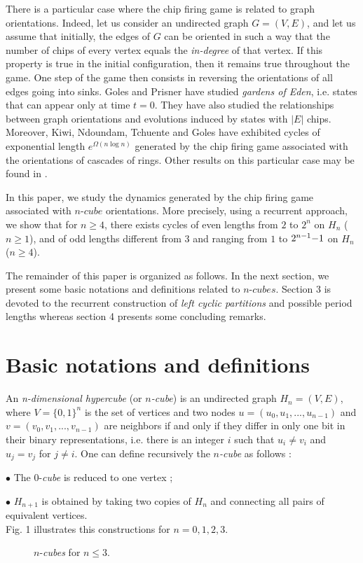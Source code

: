 \documentclass{article}
\begin{document}
There is a particular case where the chip firing game is related to graph
orientations. Indeed, let us consider an undirected graph $G=(V,E)$, and let
us
assume that initially, the edges of $G$ can be oriented in such a way that the
number of chips of every vertex equals the {\em in-degree} of that vertex. If
this property is true in the initial configuration, then it remains true throughout the
game. One step of the game then consists in reversing the orientations of all
edges going into sinks. Goles and Prisner \cite{GOL:00} have studied {\em gardens
of Eden}, i.e. states that can appear only at time $t=0$. They have also
studied the relationships between graph orientations and evolutions induced by
states with $|E|$ chips. Moreover, Kiwi, Ndoundam, Tchuente and Goles
\cite{KIW:94} have exhibited cycles of exponential length $e^{\Omega (n\log n)}$
generated by the chip firing game associated with the orientations of cascades
of rings. Other results on this particular case may be found in \cite{ERI:94}.

In this paper, we study the dynamics generated by the chip firing game
associated with $n$-$cube$ orientations. More precisely, using a
recurrent approach, we show that for $n\geq 4$, there exists cycles of even lengths from
 $2$ to $2^n$ on $H_n$ ($n\geq 1$), and of odd lengths different from $3$ and ranging from $1$ to
 $2^{n{\rm -}1}{\rm -}1$ on $H_n$ ($n\geq 4$).

The remainder of this paper is organized as follows. In the next section, we
present some basic notations and definitions related to $n$-$cubes$. Section 3 is devoted to the recurrent
 construction of {\em left cyclic partitions} and possible period lengths whereas section 4 presents some concluding remarks.

\section{Basic notations and definitions}
An {\em n-dimensional hypercube} (or $n${\em -cube}) is an undirected graph
$H_n=(V,E)$, where $V=\{ 0,1 \} ^n$ is the set of vertices and two nodes
$u=(u_0,u_1,...,u_{n-1})$ and $v=(v_0,v_1,...,v_{n-1})$ are neighbors if and
only if they differ in only one bit in their binary representations, i.e.
there is an integer $i$ such that $u_i\neq v_i$ and $u_j=v_j$ for $j\neq
i$. One can define recursively the $n${\em -cube} as follows :

$\bullet$ The $0$-{\em cube} is reduced to one vertex ;

$\bullet$ $H_{n+1}$ is obtained by taking two copies of $H_{n}$ and connecting
all pairs of equivalent vertices.\\
Fig. 1 illustrates this constructions for $n=0,1,2,3$.
\begin{figure}[htbp]
\centering
\epsfxsize=8.6cm
\caption{\label{figgraph} $n$-{\em cubes} for $n\leq 3$.}
\end{figure}
\end{document}
